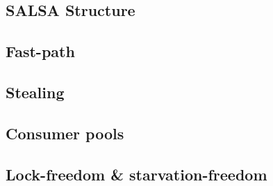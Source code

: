 \subsection{SALSA Structure}
%
\subsection{Fast-path}
\subsection{Stealing}
\subsection{Consumer pools}
\subsection{Lock-freedom \& starvation-freedom}
